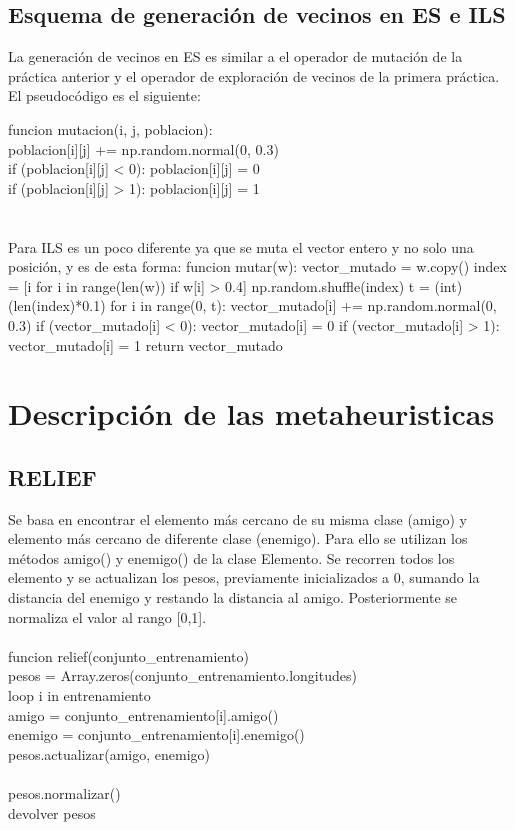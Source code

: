 \documentclass[12pt, spanish]{article}
\newcommand\tab[1][1cm]{\hspace*{#1}}
\begin{document}
\subsection{Esquema de generación de vecinos en ES e ILS}
La generación de vecinos en ES es similar a el operador de mutación de la práctica anterior y el operador de exploración de vecinos de la primera práctica. El pseudocódigo es el siguiente: 

funcion mutacion(i, j, poblacion):\\
\tab  poblacion[i][j] += np.random.normal(0, 0.3)\\
\tab  if (poblacion[i][j] < 0): poblacion[i][j] = 0\\
\tab  if (poblacion[i][j] > 1): poblacion[i][j] = 1\\
\\
\\
Para ILS es un poco diferente ya que se muta el vector entero y no solo una posición, y es de esta forma: 
\tab funcion mutar(w):
\tab\tab vector_mutado = w.copy()
 \tab index = [i for i in range(len(w)) if w[i] > 0.4]
  \tab np.random.shuffle(index)
  \tab t = (int)(len(index)*0.1)
  \tab   for i in range(0, t):
 \tab  \tab vector_mutado[i] += np.random.normal(0, 0.3)
   \tab \tab if (vector_mutado[i] < 0):
 \tab \tab \tab vector_mutado[i] = 0
 \tab \tab  if (vector_mutado[i] > 1):
 \tab \tab \tab vector_mutado[i] = 1
  \tab  return vector_mutado

\pagebreak


\section{Descripción de las metaheuristicas}
\subsection{RELIEF }
Se basa en encontrar el elemento más cercano de su misma clase (amigo) y elemento más cercano de diferente clase (enemigo). Para ello se utilizan los métodos amigo() y enemigo() de la clase Elemento. Se recorren todos los elemento y se actualizan los pesos, previamente inicializados a 0, sumando la distancia del enemigo y restando la distancia al amigo. Posteriormente se normaliza el valor al rango [0,1]. \\
\\
funcion relief(conjunto\_entrenamiento) {\\
\tab	pesos = Array.zeros(conjunto\_entrenamiento.longitudes)\\
\tab	loop i in entrenamiento {\\
\tab\tab		amigo = conjunto\_entrenamiento[i].amigo() \\
\tab\tab		enemigo = conjunto\_entrenamiento[i].enemigo() \\
\tab		pesos.actualizar(amigo, enemigo) \\
	}\\
\tab	pesos.normalizar() \\
\tab	devolver pesos\\
}\\
\end{document}
